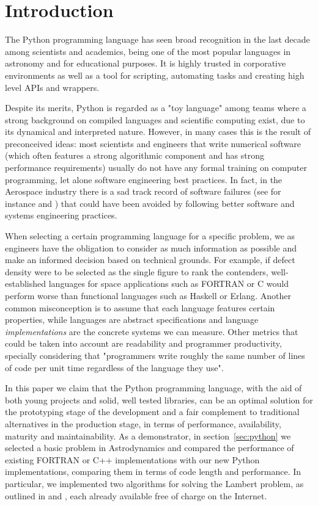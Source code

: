 \section{Introduction}
\label{sec:intro}

The Python programming language has seen broad recognition in the last decade among scientists and academics, being one of the most popular languages in astronomy\cite{Robitaille2013} and for educational purposes\cite{guo2014python}. It is highly trusted in corporative environments as well as a tool for scripting, automating tasks and creating high level APIs and wrappers.

Despite its merits, Python is regarded as a "toy language" among teams where a strong background on compiled languages and scientific computing exist, due to its dynamical and interpreted nature. However, in many cases this is the result of preconceived ideas: most scientists and engineers that write numerical software (which often features a strong algorithmic component and has strong performance requirements) usually do not have any formal training on computer programming, let alone software engineering best practices\cite{Wilson2014}. In fact, in the Aerospace industry there is a sad track record of software failures (see for instance \cite{albee2000report} and \cite{lions1996report}) that could have been avoided by following better software and systems engineering practices.

When selecting a certain programming language for a specific problem, we as engineers have the obligation to consider as much information as possible and make an informed decision based on technical grounds. For example, if defect density were to be selected as the single figure to rank the contenders, well-established languages for space applications such as FORTRAN or C would perform worse than functional languages such as Haskell or Erlang\cite{Ray2014}. Another common misconception is to assume that each language features certain properties, while languages are abstract specifications and language \textit{implementations} are the concrete systems we can measure. Other metrics that could be taken into account are readability and programmer productivity, specially considering that "programmers write roughly the same number of lines of code per unit time regardless of the language they use"\cite{Wilson2014}.

In this paper we claim that the Python programming language, with the aid of both young projects and solid, well tested libraries, can be an optimal solution for the prototyping stage of the development and a fair complement to traditional alternatives in the production stage, in terms of performance, availability, maturity and maintainability. As a demonstrator, in section~\ref{sec:python} we selected a basic problem in Astrodynamics and compared the performance of existing FORTRAN or C++ implementations with our new Python implementations, comparing them in terms of code length and performance. In particular, we implemented two algorithms for solving the Lambert problem, as outlined in \cite{vallado2001fundamentals} and \cite{Izzo2014}, each already available free of charge on the Internet.

